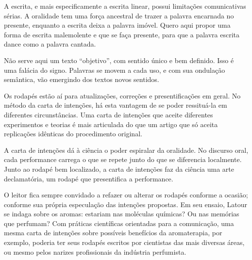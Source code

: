 A escrita, e mais especificamente a escrita linear, possui limitações comunicativas sérias. A oralidade tem uma força ancestral de trazer a palavra encarnada no presente, enquanto a escrita deixa a palavra imóvel. Quero aqui propor uma forma de escrita malemolente e que se faça presente, para que a palavra escrita dance como a palavra cantada.

Não serve aqui um texto \enquote{objetivo}, com sentido único e bem definido. Isso é uma falácia do signo. Palavras se movem a cada uso, e com sua ondulação semântica, vão emergindo dos textos novos sentidos.

Os rodapés estão aí para atualizações, correções e presentificações em geral. No método da carta de intenções, há esta vantagem de se poder ressituá-la em diferentes circunstâncias. Uma carta de intenções que aceite diferentes experimentos e teorias é mais articulada do que um artigo que só aceita replicações idênticas do procedimento original.

A carta de intenções dá à ciência o poder espiralar da oralidade. No discurso oral, cada performance carrega o que se repete junto do que se diferencia localmente. Junto ao rodapé bem localizado, a carta de intenções faz da ciência uma arte declamatória, um rodapé que presentifica a performance.

O leitor fica sempre convidado a refazer ou alterar os rodapés conforme a ocasião; conforme sua própria especulação das intenções propostas. Em seu ensaio, Latour se indaga sobre os aromas: estariam nas moléculas químicas? Ou nas memórias que perfumam? Com práticas científicas orientadas para a comunicação, uma mesma carta de intenções sobre possíveis benefícios da aromaterapia, por exemplo, poderia ter seus rodapés escritos por cientistas das mais diversas áreas, ou mesmo pelos narizes profissionais da indústria perfumista.

